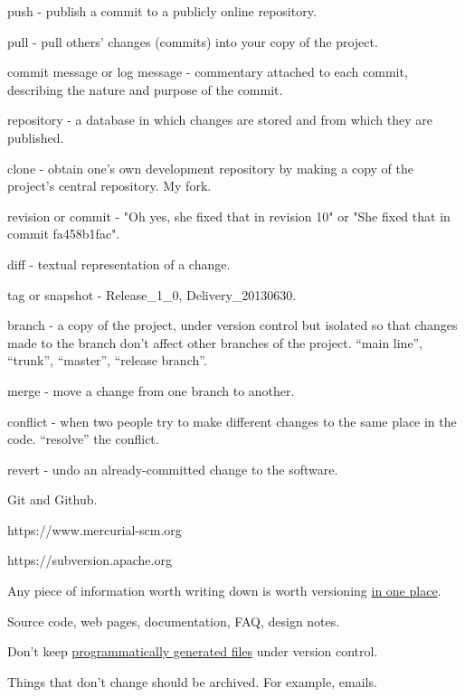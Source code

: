 \documentclass[landscape,30pt]{foils}
\begin{document}
push - publish a commit to a publicly online repository.

pull - pull others' changes (commits) into your copy of the project.

commit message or log message -  commentary attached to each commit, describing the nature and purpose of the commit.

repository -  a database in which changes are stored and from which they are published.

clone - obtain one's own development repository by making a copy of the project's central repository.  My fork.

revision or  commit - "Oh yes, she fixed that in revision 10" or "She fixed that in commit fa458b1fac".

diff - textual representation of a change.

tag or snapshot - Release\_1\_0, Delivery\_20130630.

branch - a copy of the project, under version control but isolated so that changes made to the branch don't affect other branches of the project. ``main line'', ``trunk'', ``master'', ``release branch''.

merge - move a change from one branch to another.

conflict - when two people try to make different changes to the same place in the code.  ``resolve'' the conflict.

revert - undo an already-committed change to the software.



Git and Github.

https://www.mercurial-scm.org

https://subversion.apache.org



Any piece of information worth writing down is worth versioning \underline{in one place}.

Source code, web pages, documentation, FAQ, design notes.

Don't keep \underline{programmatically generated files} under version control. 

Things that don't change should be archived. For example, emails.


\end{document}
